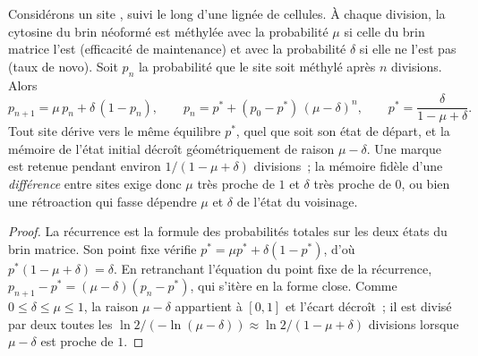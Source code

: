\begin{theorem}\label{thm:b3:chromatin-epigenetics:maintenance}
Considérons un site , suivi le long d'une lignée de cellules. À
chaque division, la cytosine du brin néoformé est méthylée avec la
probabilité $\mu$ si celle du brin matrice l'est (efficacité de
maintenance) et avec la probabilité $\delta$ si elle ne l'est pas (taux
de novo). Soit $p_{n}$ la probabilité que le site soit méthylé après
$n$ divisions. Alors
\[
p_{n+1} = \mu\, p_{n} + \delta\,(1 - p_{n}),
\qquad
p_{n} = p^{*} + (p_{0} - p^{*})\,(\mu - \delta)^{n},
\qquad
p^{*} = \frac{\delta}{1 - \mu + \delta}.
\]
Tout site dérive vers le même équilibre $p^{*}$, quel que soit son état
de départ, et la mémoire de l'état initial décroît géométriquement de
raison $\mu - \delta$. Une marque est retenue pendant environ
$1/(1 - \mu + \delta)$ divisions~; la mémoire fidèle d'une
\emph{différence} entre sites exige donc $\mu$ très proche de $1$ et
$\delta$ très proche de $0$, ou bien une rétroaction qui fasse dépendre
$\mu$ et $\delta$ de l'état du voisinage.
\end{theorem}
\begin{proof}
La récurrence est la formule des probabilités totales sur les deux
états du brin matrice. Son point fixe vérifie $p^{*} = \mu p^{*} + \delta(1 -
p^{*})$, d'où $p^{*}(1 - \mu + \delta) = \delta$. En retranchant
l'équation du point fixe de la récurrence, $p_{n+1} - p^{*} = (\mu -
\delta)(p_{n} - p^{*})$, qui s'itère en la forme close. Comme
$0 \le \delta \le \mu \le 1$, la raison $\mu - \delta$ appartient à $[0,1]$
et l'écart décroît~; il est divisé par deux toutes les $\ln 2 / (-\ln(\mu -
\delta)) \approx \ln 2/(1 - \mu + \delta)$ divisions lorsque $\mu -
\delta$ est proche de $1$.
\end{proof}

